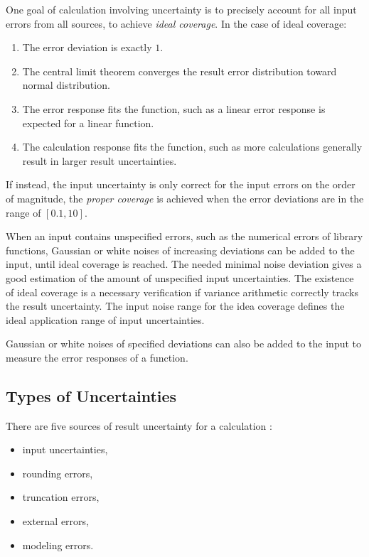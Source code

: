 \documentclass[twoside]{article}
\numberwithin{equation}{section}
\begin{document}
One goal of calculation involving uncertainty is to precisely account for all input errors from all sources, to achieve \emph{ideal coverage}.
In the case of ideal coverage:
\begin{enumerate}
\item The error deviation is exactly $1$.

\item The central limit theorem converges the result error distribution toward normal distribution.

\item The error response fits the function, such as a linear error response is expected for a linear function.

\item The calculation response fits the function, such as more calculations generally result in larger result uncertainties.

\end{enumerate}
If instead, the input uncertainty is only correct for the input errors on the order of magnitude, the \emph{proper coverage} is achieved when the error deviations are in the range of $[0.1, 10]$.

When an input contains unspecified errors, such as the numerical errors of library functions, Gaussian or white noises of increasing deviations can be added to the input, until ideal coverage is reached.
The needed minimal noise deviation gives a good estimation of the amount of unspecified input uncertainties.
The existence of ideal coverage is a necessary verification if variance arithmetic correctly tracks the result uncertainty.
The input noise range for the idea coverage defines the ideal application range of input uncertainties.

Gaussian or white noises of specified deviations can also be added to the input to measure the error responses of a function.



\subsection{Types of Uncertainties}

There are five sources of result uncertainty for a calculation \cite{Statistical_Methods}\cite{Numerical_Recipes}:
\begin{itemize}
\item input uncertainties,
\item rounding errors,
\item truncation errors,
\item external errors,
\item modeling errors.
\end{itemize}
\end{document}
